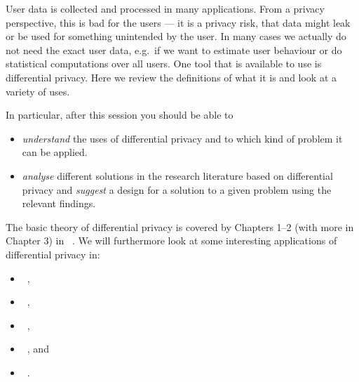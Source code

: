 User data is collected and processed in many applications.
From a privacy perspective, this is bad for the users --- it is a privacy risk,
that data might leak or be used for something unintended by the user.
In many cases we actually do not need the exact user data, e.g.\ if we want to 
estimate user behaviour or do statistical computations over all users.
One tool that is available to use is differential privacy.
Here we review the definitions of what it is and look at a variety of uses.

In particular, after this session you should be able to
\begin{itemize}
  \item \emph{understand} the uses of differential privacy and to which kind of 
    problem it can be applied.
  \item \emph{analyse} different solutions in the research literature based on 
    differential privacy and \emph{suggest} a design for a solution to a given 
    problem using the relevant findings.
\end{itemize}

The basic theory of differential privacy is covered by Chapters 1--2 (with more
in Chapter 3) in 
~\cite{DifferentialPrivacyBook}.
We will furthermore look at some interesting applications of differential 
privacy in:
\begin{itemize}
  \item {}~\cite{ChallengingDiffPriv},
  \item {}~\cite{BLIP-1},
  \item {}~\cite{BLIP-2},
  \item {}~\cite{RAPPOR}, and
  \item {}~\cite{RAPPOR-unknown}.
\end{itemize}

